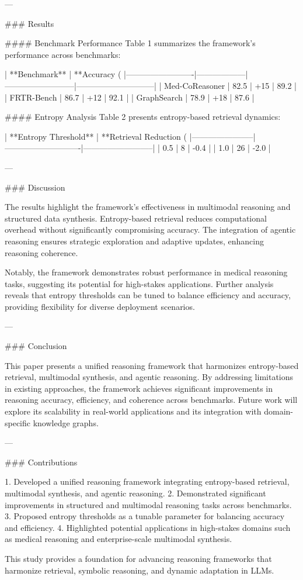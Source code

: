 ---

### Results

#### Benchmark Performance
Table 1 summarizes the framework's performance across benchmarks:

| **Benchmark**          | **Accuracy (%
|-------------------------|------------------|--------------------------|-----------------------------|
| Med-CoReasoner          | 82.5            | +15                     | 89.2                       |
| FRTR-Bench              | 86.7            | +12                     | 92.1                       |
| GraphSearch             | 78.9            | +18                     | 87.6                       |

#### Entropy Analysis
Table 2 presents entropy-based retrieval dynamics:

| **Entropy Threshold** | **Retrieval Reduction (%
|-----------------------|----------------------------|--------------------------|
| 0.5                  | 8                          | -0.4                    |
| 1.0                  | 26                         | -2.0                    |

---

### Discussion

The results highlight the framework's effectiveness in multimodal reasoning and structured data synthesis. Entropy-based retrieval reduces computational overhead without significantly compromising accuracy. The integration of agentic reasoning ensures strategic exploration and adaptive updates, enhancing reasoning coherence.

Notably, the framework demonstrates robust performance in medical reasoning tasks, suggesting its potential for high-stakes applications. Further analysis reveals that entropy thresholds can be tuned to balance efficiency and accuracy, providing flexibility for diverse deployment scenarios.

---

### Conclusion

This paper presents a unified reasoning framework that harmonizes entropy-based retrieval, multimodal synthesis, and agentic reasoning. By addressing limitations in existing approaches, the framework achieves significant improvements in reasoning accuracy, efficiency, and coherence across benchmarks. Future work will explore its scalability in real-world applications and its integration with domain-specific knowledge graphs.

---

### Contributions

1. Developed a unified reasoning framework integrating entropy-based retrieval, multimodal synthesis, and agentic reasoning.
2. Demonstrated significant improvements in structured and multimodal reasoning tasks across benchmarks.
3. Proposed entropy thresholds as a tunable parameter for balancing accuracy and efficiency.
4. Highlighted potential applications in high-stakes domains such as medical reasoning and enterprise-scale multimodal synthesis.

This study provides a foundation for advancing reasoning frameworks that harmonize retrieval, symbolic reasoning, and dynamic adaptation in LLMs.